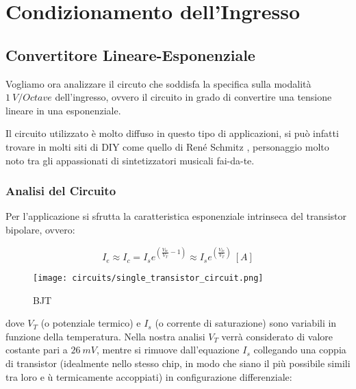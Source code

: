 \chapter{Condizionamento dell'Ingresso}


\section{Convertitore Lineare-Esponenziale}


Vogliamo ora analizzare il circuto che soddisfa la specifica sulla modalità $1\ V/Octave$
dell'ingresso, ovvero il circuito in grado di convertire una tensione lineare in una
esponenziale.

Il circuito utilizzato è molto diffuso in questo tipo di applicazioni, si può infatti
trovare in molti siti di DIY come quello di René Schmitz \cite{expo_converter}, personaggio
molto noto tra gli appassionati di sintetizzatori musicali fai-da-te.


\subsection*{Analisi del Circuito}


Per l'applicazione si sfrutta la caratteristica esponenziale intrinseca del transistor
bipolare, ovvero:

\begin{equation}\label{transistor_current}
    I_e\approx I_c=I_se^{\left(\frac{V_{be}}{V_T}-1\right)}
    \approx I_se^{\left(\frac{V_{be}}{V_T}\right)}\ [A]
\end{equation}

\begin{figure}[H]
    \centering
    \texttt{[image: circuits/single\_transistor\_circuit.png]}
    \caption{BJT}
    \label{bjt}
\end{figure}

dove $V_T$ (o potenziale termico) e $I_s$ (o corrente di saturazione) sono variabili in
funzione della temperatura. Nella nostra analisi $V_T$ verrà considerato di valore costante
pari a $26\ mV$, mentre si rimuove dall'equazione $I_s$ collegando una coppia di transistor
(idealmente nello stesso chip, in modo che siano il più possibile simili tra loro e ù
termicamente accoppiati) in configurazione differenziale:

